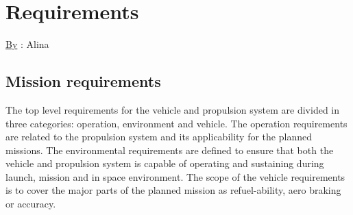 \chapter{Requirements}
\qquad \underline{By} : Alina\\
\label{chap:2}
\section{Mission requirements}
The top level requirements for the vehicle and propulsion system are divided in three categories: operation, environment and vehicle. The operation requirements are related to the propulsion system and its applicability for the planned missions. The environmental requirements are defined to ensure that both the vehicle and propulsion system is capable of operating and sustaining during launch, mission and in space environment. The scope of the vehicle requirements is to cover the major parts of the planned mission as refuel-ability, aero braking or accuracy. \\
\noindent
